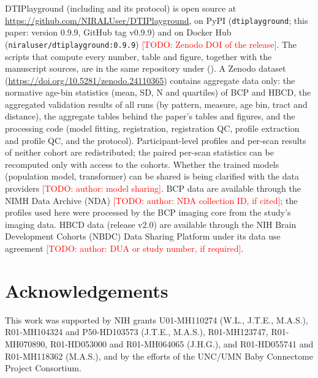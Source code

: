 \documentclass[11pt]{article}
\newcommand{\todo}[1]{\textcolor{red}{[TODO: #1]}}
\begin{document}
DTIPlayground (including  and its  protocol) is open source
at \url{https://github.com/NIRALUser/DTIPlayground}, on PyPI (\texttt{dtiplayground}; this paper: version 0.9.9, GitHub tag v0.9.9) and on Docker Hub
(\texttt{niraluser/dtiplayground:0.9.9}) \todo{Zenodo DOI of the release}. The scripts that compute every number, table and figure, together with the manuscript sources, are in the same
repository under  (). A Zenodo dataset \citep{styner2026aggregate}
(\url{https://doi.org/10.5281/zenodo.24110365}) contains aggregate data only: the normative age-bin statistics (mean, SD, N and quartiles) of BCP and HBCD, the
aggregated validation results of all runs (by pattern, measure, age bin, tract and distance), the aggregate tables behind
the paper's tables and figures, and the processing code (model fitting, registration, registration QC, profile
extraction and profile QC, and the  protocol). Participant-level profiles and per-scan results of neither cohort
are redistributed; the paired per-scan statistics can be recomputed only with access to the cohorts. Whether the
trained models (population model, transformer) can be shared is being clarified with the data providers
\todo{author: model sharing}. BCP data are available through the NIMH Data Archive (NDA) \todo{author: NDA collection
ID, if cited}; the profiles used here were processed by the BCP imaging core from the study's imaging data. HBCD data (release v2.0) are
available through the NIH Brain Development Cohorts (NBDC) Data Sharing Platform under its data use agreement
\todo{author: DUA or study number, if required}.

\section*{Acknowledgements}
This work was supported by NIH grants U01-MH110274 (W.L., J.T.E., M.A.S.), R01-MH104324 and P50-HD103573 (J.T.E.,
M.A.S.), R01-MH123747, R01-MH070890, R01-HD053000 and R01-MH064065 (J.H.G.), and R01-HD055741 and R01-MH118362
(M.A.S.), and by the efforts of the UNC/UMN Baby Connectome Project Consortium.
\end{document}
